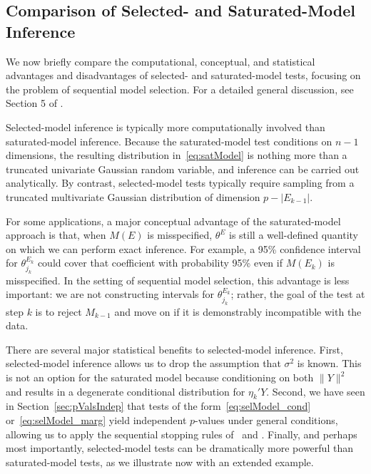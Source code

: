 \documentclass{article}
\begin{document}
\subsection{Comparison of Selected- and Saturated-Model Inference}\label{sec:bivariate}

We now briefly compare the computational, conceptual, and statistical advantages and disadvantages of selected- and saturated-model tests, focusing on the problem of sequential model selection. For a detailed general discussion, see Section 5 of \citet{fithian2014optimal}.

Selected-model inference is typically more computationally involved than saturated-model inference. Because the saturated-model test conditions on $n-1$ dimensions, the resulting distribution in~\eqref{eq:satModel} is nothing more than a truncated univariate Gaussian random variable, and inference can be carried out analytically. By contrast, selected-model tests typically require sampling from a truncated multivariate Gaussian distribution of dimension $p-|E_{k-1}|$.

For some applications, a major conceptual advantage of the saturated-model approach is that, when $M(E)$ is misspecified, $\theta^{E}$ is still a well-defined quantity on which we can perform exact inference. For example, a 95\% confidence interval for $\theta_{j_k}^{E_k}$ could cover that coefficient with probability 95\% even if $M(E_k)$ is misspecified. In the setting of sequential model selection, this advantage is less important: we are not constructing intervals for $\theta_{j_k}^{E_k}$; rather, the goal of the test at step $k$ is to reject $M_{k-1}$ and move on if it is demonstrably incompatible with the data.

There are several major statistical benefits to selected-model inference. First, selected-model inference allows us to drop the assumption that $\sigma^2$ is known. This is not an option for the saturated model because conditioning on both $\|Y\|^2$ and  results in a degenerate conditional distribution for $\eta_k'Y$. Second, we have seen in Section~\ref{sec:pValsIndep} that tests of the form~\eqref{eq:selModel_cond} or~\eqref{eq:selModel_marg} yield independent $p$-values under general conditions, allowing us to apply  the sequential stopping rules of~\citet{gsell2013sequential} and \citet{li2015accumulation}. Finally, and perhaps most importantly, selected-model tests can be dramatically more powerful than saturated-model tests, as we illustrate now with an extended example.
\end{document}
